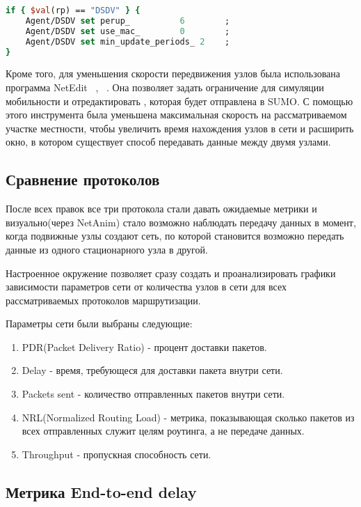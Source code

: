 \begin{lstlisting}[language=tcl, style=mystyle, caption=Дополнительные настройки для Agent/DSDV]
if { $val(rp) == "DSDV" } {
    Agent/DSDV set perup_          6        ;
    Agent/DSDV set use_mac_        0        ;
    Agent/DSDV set min_update_periods_ 2    ;
}
\end{lstlisting}

Кроме того, для уменьшения скорости передвижения узлов была использована программа NetEdit ~\cite{deepika2022sumo}, ~\cite{netedit}. Она позволяет задать ограничение для симуляции мобильности и отредактировать , которая будет отправлена в SUMO. С помощью этого инструмента была уменьшена максимальная скорость на рассматриваемом участке местности, чтобы увеличить время нахождения узлов в сети и расширить окно, в котором существует способ передавать данные между двумя узлами.

\subsection*{Сравнение протоколов}

После всех правок все три протокола стали давать ожидаемые метрики и визуально(через NetAnim) стало возможно наблюдать передачу данных в момент, когда подвижные узлы создают сеть, по которой становится возможно передать данные из одного стационарного узла в другой.

Настроенное окружение позволяет сразу создать и проанализировать графики зависимости параметров сети от количества узлов в сети для всех рассматриваемых протоколов маршрутизации.

Параметры сети были выбраны следующие: 

\begin{enumerate}
    \item PDR(Packet Delivery Ratio) - процент доставки пакетов.
    \item Delay - время, требующеся для доставки пакета внутри сети.
    \item Packets sent - количество отправленных пакетов внутри сети.
    \item NRL(Normalized Routing Load) - метрика, показывающая сколько пакетов из всех отправленных служит целям роутинга, а не передаче данных.
    \item Throughput - пропускная способность сети.
\end{enumerate}

\subsection*{Метрика End-to-end delay}

